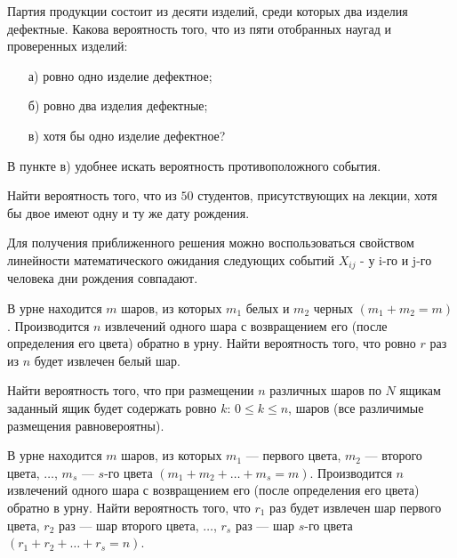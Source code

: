 \begin{problem}
Партия продукции состоит из десяти изделий, среди которых два изделия дефектные. Какова вероятность того, что из пяти отобранных 
наугад и проверенных изделий: 
\begin{enumerate}
\item[а)] ровно одно изделие дефектное; 
\item[б)] ровно два изделия дефектные; 
\item[в)] хотя бы одно изделие дефектное? 
\end{enumerate} 

\begin{ordre}
В пункте в) удобнее искать вероятность противоположного события.
\end{ordre}

\end{problem}

\begin{problem}
Найти вероятность того, что из $50$ студентов, присутствующих на лекции, хотя бы двое имеют одну и ту же дату рождения. 

\begin{remark}
Для получения приближенного решения можно воспользоваться свойством линейности математического ожидания следующих событий $X_{ij}$ - у  i-го и  j-го человека дни рождения совпадают.  
\end{remark}

\end{problem}


\begin{problem}
В урне находится $m$ шаров, из которых $m_1$ белых и $m_2$ черных $(m_1 + m_2 = m)$. 
Производится $n$ извлечений одного шара с возвращением его (после определения его цвета) обратно в урну. Найти вероятность того, 
что ровно $r$ раз из $n$ будет извлечен белый шар. 
\end{problem}


\begin{problem}
Найти вероятность того, что при размещении $n$ различных шаров по $N$ ящикам заданный ящик будет содержать ровно 
$k$: $0\leqslant k\leqslant n$, шаров (все различимые размещения равновероятны). 
\end{problem}


\begin{problem}
В урне находится $m$ шаров, из которых $m_1$ --- первого цвета, $m_2$ --- второго цвета, $\ldots$, $m_s$ --- $s$-го цвета 
$(m_1+m_2+\ldots +m_s=m)$. 
Производится $n$ извлечений одного шара с возвращением его (после определения его цвета) обратно в урну. Найти вероятность того, 
что $r_1$ раз будет извлечен шар первого цвета, $r_2$ раз --- шар второго цвета, $\ldots$, $r_s$ раз --- шар $s$-го цвета 
$(r_1+r_2+\ldots +r_s=n)$. 
\end{problem}


